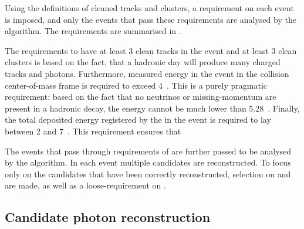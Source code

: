 Using the definitions of cleaned tracks and \ECL clusters, a requirement on each event is imposed, and only the events that pass these requirements are analysed by the \FEI algorithm.
The requirements are summarised in .

\begin{table}[htbp!]
    \centering
     \caption{\label{tab:fei_precuts} \FEI pre-selections.}
\end{table}
The requirements to have at least 3 clean tracks in the event and at least 3 clean \ECL clusters is based on the fact, that a hadronic day will produce many charged tracks and photons.
Furthermore, measured energy in the event in the \epem collision center-of-mass frame is required to exceed 4~\gev.
This is a purely pragmatic requirement: based on the fact that no neutrinos or missing-momentum are present in a hadronic decay, the energy cannot be much lower than 5.28~\gev.
Finally, the total deposited energy registered by the \ECL in the event is required to lay between 2 and 7~\gev.
This requirement ensures that

The events that pass through requirements of  are further passed to be analysed by the \FEI algorithm.
In each event multiple \FEI candidates are reconstructed.
To focus only on the candidates that have been correctly reconstructed, selection on \DeltaE and \Mbc are made, as well as a loose-requirement on \feiProb.

\subsection{Candidate photon reconstruction}

